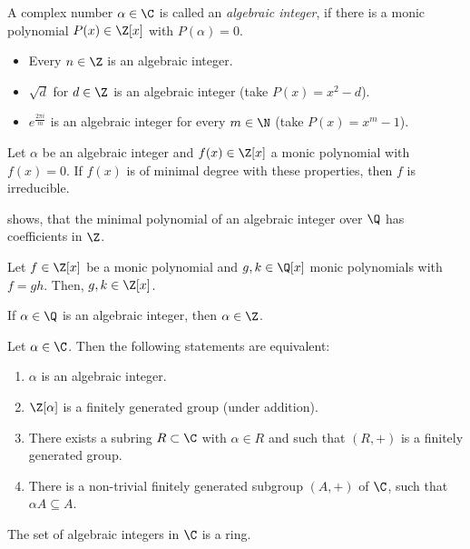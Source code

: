 \begin{defn*}
	A complex number \( \alpha \in \C \) is called an \emph{algebraic integer}, if there is a monic polynomial \( P(x) \in \Z[x] \) with \( P(\alpha) = 0 \).
\end{defn*}

\begin{exmp*}
	\begin{itemize}
		\item Every \( n \in \Z \) is an algebraic integer.
		\item \( \sqrt{d} \) for \( d \in \Z \) is an algebraic integer (take \( P(x) = x^2-d \)).
		\item \( e^\frac{2\pi i}{m} \) is an algebraic integer for every \( m \in \N \) (take \( P(x) = x^m - 1 \)).
	\end{itemize}
\end{exmp*}

\begin{thmn}\label{thm:irred_poly}
	Let \( \alpha \) be an algebraic integer and \( f(x) \in \Z[x] \) a monic polynomial with \( f(x)=0 \).
	If \( f(x) \) is of minimal degree with these properties, then \( f \) is irreducible.
\end{thmn}

\begin{rem*}
	 shows, that the minimal polynomial of an algebraic integer over \( \Q \) has coefficients in \( \Z \).
\end{rem*}

\begin{lem}
	Let \( f \in \Z[x] \) be a monic polynomial and \( g, k \in \Q[x] \) monic polynomials with \( f = gh \). Then, \( g,k \in \Z[x] \).
\end{lem}

\begin{cor}
	If \( \alpha \in \Q \) is an algebraic integer, then \( \alpha \in \Z \).
\end{cor}

\begin{thmn}
	Let \( \alpha \in \C \). Then the following statements are equivalent:
	\begin{enumerate}[label=({\roman*})]
		\item \( \alpha \) is an algebraic integer.
		\item \( \Z[\alpha] \) is a finitely generated group (under addition).
		\item There exists a subring \( R \subset \C \) with \( \alpha \in R \) and such that \( (R, +) \) is a finitely generated group.
		\item There is a non-trivial finitely generated subgroup \( (A, +) \) of \( \C \), such that \( \alpha A \subseteq A \).
	\end{enumerate}
\end{thmn}

\begin{cor}
	The set of algebraic integers in \( \C \) is a ring.
\end{cor}